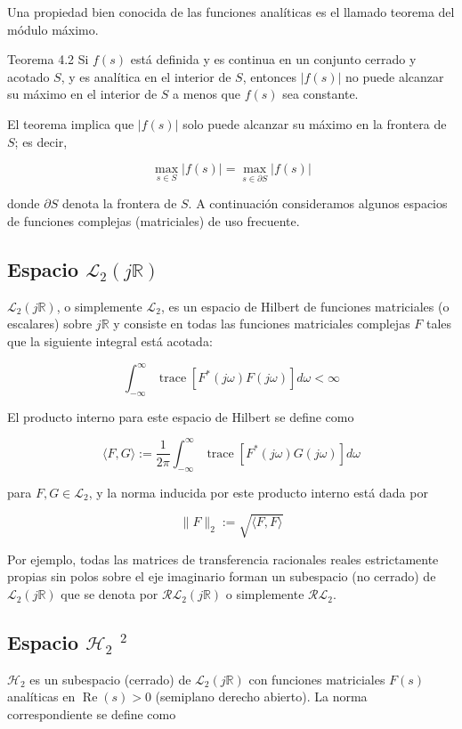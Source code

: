 Una propiedad bien conocida de las funciones analíticas es el llamado teorema del módulo máximo.

Teorema 4.2 Si $f(s)$ está definida y es continua en un conjunto cerrado y acotado $S$, y es analítica en el interior de $S$, entonces $|f(s)|$ no puede alcanzar su máximo en el interior de $S$ a menos que $f(s)$ sea constante.

El teorema implica que $|f(s)|$ solo puede alcanzar su máximo en la frontera de $S$; es decir,

$$
\max _{s \in S}|f(s)|=\max _{s \in \partial S}|f(s)|
$$

donde $\partial S$ denota la frontera de $S$. A continuación consideramos algunos espacios de funciones complejas (matriciales) de uso frecuente.

\subsection*{Espacio $\mathcal{L}_{2}(j \mathbb{R})$}
$\mathcal{L}_{2}(j \mathbb{R})$, o simplemente $\mathcal{L}_{2}$, es un espacio de Hilbert de funciones matriciales (o escalares) sobre $j \mathbb{R}$ y consiste en todas las funciones matriciales complejas $F$ tales que la siguiente integral está acotada:

$$
\int_{-\infty}^{\infty} \operatorname{trace}\left[F^{*}(j \omega) F(j \omega)\right] d \omega<\infty
$$

El producto interno para este espacio de Hilbert se define como

$$
\langle F, G\rangle:=\frac{1}{2 \pi} \int_{-\infty}^{\infty} \operatorname{trace}\left[F^{*}(j \omega) G(j \omega)\right] d \omega
$$

para $F, G \in \mathcal{L}_{2}$, y la norma inducida por este producto interno está dada por

$$
\|F\|_{2}:=\sqrt{\langle F, F\rangle}
$$

Por ejemplo, todas las matrices de transferencia racionales reales estrictamente propias sin polos sobre el eje imaginario forman un subespacio (no cerrado) de $\mathcal{L}_{2}(j \mathbb{R})$ que se denota por $\mathcal{R} \mathcal{L}_{2}(j \mathbb{R})$ o simplemente $\mathcal{R} \mathcal{L}_{2}$.

\subsection*{Espacio $\mathcal{H}_{2}$ ${ }^{2}$}
$\mathcal{H}_{2}$ es un subespacio (cerrado) de $\mathcal{L}_{2}(j \mathbb{R})$ con funciones matriciales $F(s)$ analíticas en $\operatorname{Re}(s)>0$ (semiplano derecho abierto). La norma correspondiente se define como

